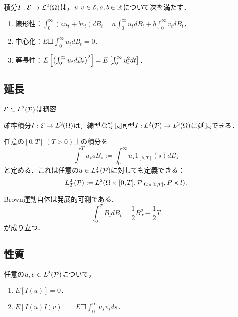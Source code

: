 \documentclass[uplatex,dvipdfmx]{jsreport}
\begin{document}
\begin{lemma}
    積分$I:\E\to\L^2(\Om)$は，$u,v\in\E,a,b\in\R$について次を満たす．
    \begin{enumerate}
        \item 線形性：$\int^\infty_0(au_t+bv_t)dB_t=a\int^\infty_0u_tdB_t+b\int^\infty_0v_tdB_t$．
        \item 中心化：$E\Square{\int^\infty_0u_tdB_t}=0$．
        \item 等長性：$E\Square{\paren{\int^\infty_0u_tdB_t}^2}=E\Square{\int^\infty_0u^2_tdt}$．
    \end{enumerate}
\end{lemma}

\subsection{延長}

\begin{proposition}
    $\E\subset L^2(\P)$は稠密．
\end{proposition}

\begin{proposition}
    確率積分$I:\E\to L^2(\Om)$は，線型な等長同型$I:L^2(\P)\to L^2(\Om)$に延長できる．
\end{proposition}

\begin{definition}
    任意の$[0,T]\;(T>0)$上の積分を
    \[\int^T_0u_sdB_s:=\int^\infty_0u_s1_{[0,T]}(s)dB_s\]
    と定める．これは任意の$u\in L^2_T(\P)$に対しても定義できる：
    \[L^2_T(\P):=L^2(\Om\times[0,T],\P|_{\Om\times[0,T]},P\times l).\]
\end{definition}

\begin{example}
    Brown運動自体は発展的可測である．
    \[\int^T_0B_tdB_t=\frac{1}{2}B^2_T-\frac{1}{2}T\]
    が成り立つ．
\end{example}

\subsection{性質}

\begin{proposition}
    任意の$u,v\in L^2(\P)$について，
    \begin{enumerate}
        \item $E[I(u)]=0$．
        \item $E[I(u)I(v)]=E\Square{\int^\infty_0u_sv_sds}$．
    \end{enumerate}
\end{proposition}
\end{document}
